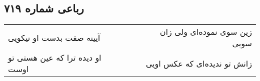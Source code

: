 \begin{center}
\section*{رباعی شماره ۷۱۹}
\label{sec:sh719}
\begin{longtable}{l p{0.5cm} r}
آیینه صفت بدست او نیکویی
&&
زین سوی نموده‌ای ولی زان سویی
\\
او دیده ترا که عین هستی تو اوست
&&
زانش تو ندیده‌ای که عکس اویی
\\
\end{longtable}
\end{center}
